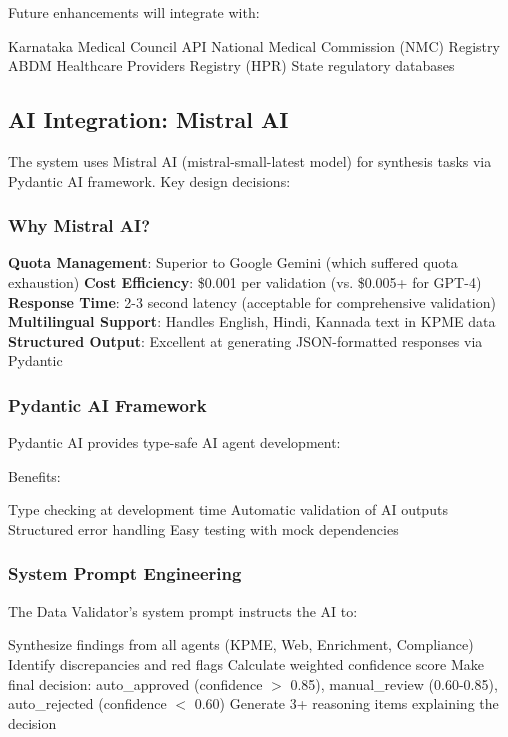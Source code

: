 \documentclass[conference]{IEEEtran}
\begin{document}
Future enhancements will integrate with:

Karnataka Medical Council API
National Medical Commission (NMC) Registry
ABDM Healthcare Providers Registry (HPR)
State regulatory databases

\subsection{AI Integration: Mistral AI}

The system uses Mistral AI (mistral-small-latest model) for synthesis tasks via Pydantic AI framework. Key design decisions:

\subsubsection{Why Mistral AI?}

\textbf{Quota Management}: Superior to Google Gemini (which suffered quota exhaustion)
\textbf{Cost Efficiency}: \$0.001 per validation (vs. \$0.005+ for GPT-4)
\textbf{Response Time}: 2-3 second latency (acceptable for comprehensive validation)
\textbf{Multilingual Support}: Handles English, Hindi, Kannada text in KPME data
\textbf{Structured Output}: Excellent at generating JSON-formatted responses via Pydantic

\subsubsection{Pydantic AI Framework}

Pydantic AI provides type-safe AI agent development:

Benefits:

Type checking at development time
Automatic validation of AI outputs
Structured error handling
Easy testing with mock dependencies

\subsubsection{System Prompt Engineering}

The Data Validator's system prompt instructs the AI to:

Synthesize findings from all agents (KPME, Web, Enrichment, Compliance)
Identify discrepancies and red flags
Calculate weighted confidence score
Make final decision: auto\_approved (confidence $>$ 0.85), manual\_review (0.60-0.85), auto\_rejected (confidence $<$ 0.60)
Generate 3+ reasoning items explaining the decision
\end{document}
